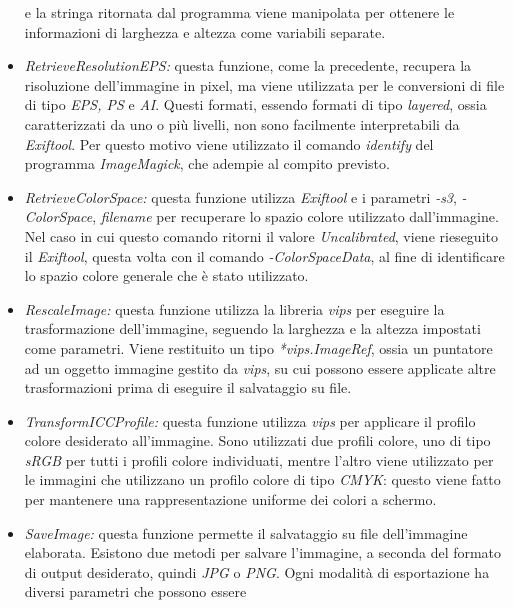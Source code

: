 \begin{itemize}
          e la stringa ritornata dal programma viene manipolata per ottenere le
          informazioni di larghezza e altezza come variabili separate.
    \item \emph{RetrieveResolutionEPS:} questa funzione, come la precedente,
          recupera la risoluzione dell'immagine in pixel, ma viene utilizzata per le
          conversioni di file di tipo \emph{EPS, PS} e \emph{AI}. Questi formati,
          essendo formati di tipo \emph{layered}, ossia caratterizzati da uno o più
          livelli, non sono facilmente interpretabili da \emph{Exiftool}. Per questo
          motivo viene utilizzato il comando \emph{identify} del programma
          \emph{ImageMagick}, che adempie al compito previsto.
    \item \emph{RetrieveColorSpace:} questa funzione utilizza \emph{Exiftool} e
          i parametri \emph{-s3}, \emph{-ColorSpace}, \emph{filename} per recuperare
          lo spazio colore utilizzato dall'immagine. Nel caso in cui questo comando
          ritorni il valore \emph{Uncalibrated}, viene rieseguito il \emph{Exiftool},
          questa volta con il comando \emph{-ColorSpaceData}, al fine di identificare
          lo spazio colore generale che è stato utilizzato.
    \item \emph{RescaleImage:} questa funzione utilizza la libreria \emph{vips}
          per eseguire la trasformazione dell'immagine, seguendo la larghezza e la
          altezza impostati come parametri. Viene restituito un tipo
          \emph{*vips.ImageRef}, ossia un puntatore ad un oggetto immagine gestito da
          \emph{vips}, su cui possono essere applicate altre trasformazioni prima di
          eseguire il salvataggio su file.
    \item \emph{TransformICCProfile:} questa funzione utilizza \emph{vips} per
          applicare il profilo colore desiderato all'immagine. Sono utilizzati due
          profili colore, uno di tipo \emph{sRGB} per tutti i profili colore
          individuati, mentre l'altro viene utilizzato per le immagini che utilizzano
          un profilo colore di tipo \emph{CMYK}: questo viene fatto per mantenere una
          rappresentazione uniforme dei colori a schermo.
    \item \emph{SaveImage:} questa funzione permette il salvataggio su file
          dell'immagine elaborata. Esistono due metodi per salvare l'immagine, a
          seconda del formato di output desiderato, quindi \emph{JPG} o \emph{PNG}.
          Ogni modalità di esportazione ha diversi parametri che possono essere

\end{itemize}
